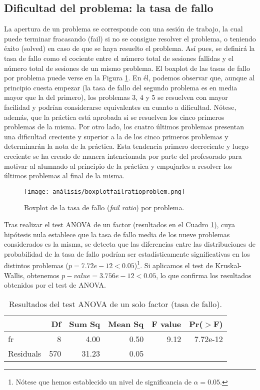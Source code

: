 \subsection{Dificultad del problema: la tasa de fallo}

La apertura de un problema se corresponde con una sesión de trabajo, la cual puede terminar fracasando (fail) si no se consigue resolver el problema, o teniendo éxito (solved) en caso de que se haya resuelto el problema. Así pues, se definirá la tasa de fallo como el cociente entre el número total de sesiones fallidas y el número total de sesiones de un mismo problema. El boxplot de las tasas de fallo por problema puede verse en la Figura \ref{fig:boxplotfailratio}. En él, podemos observar que, aunque al principio cuesta empezar (la tasa de fallo del segundo problema es en media mayor que la del primero), los problemas $3$, $4$ y $5$ se resuelven con mayor facilidad y podrían considerarse equivalentes en cuanto a dificultad. Nótese, además, que la práctica está aprobada si se resuelven los cinco primeros problemas de la misma. Por otro lado, los cuatro últimos problemas presentan una dificultad creciente y superior a la de los cinco primeros problemas y determinarán la nota de la práctica. Esta tendencia primero decreciente y luego creciente se ha creado de manera intencionada por parte del profesorado para motivar al alumnado al principio de la práctica y empujarles a resolver los últimos problemas al final de la misma.

\begin{figure}[H]
    \centering
    \texttt{[image: análisis/boxplotfailratioproblem.png]}
    \caption{Boxplot de la tasa de fallo (\emph{fail ratio}) por problema.}
    \label{fig:boxplotfailratio}
\end{figure}

Tras realizar el test ANOVA de un factor (resultados en el Cuadro \ref{tab:ANOVAfailratio}), cuya hipótesis nula establece que la tasa de fallo media de los nueve problemas considerados es la misma, se detecta que las diferencias entre las distribuciones de probabilidad de la tasa de fallo  podrían ser estadísticamente significativas en los distintos problemas ($p = 7.72e-12 < 0.05$)\footnote{Nótese que hemos establecido un nivel de significancia de $\alpha = 0.05$.}. Si aplicamos el test de Kruskal-Wallis, obtenemos $p-value = 3.756e-12 < 0.05$, lo que confirma los resultados obtenidos por el test de ANOVA.

\begin{table}[H]
\centering
\caption{Resultados del test ANOVA de un solo factor (tasa de fallo).}
\label{tab:ANOVAfailratio}
\begin{tabular}{lrrrrr}
  \hline
 & Df & Sum Sq & Mean Sq & F value & Pr($>$F) \\ 
  \hline
fr & 8 & 4.00 & 0.50 & 9.12 & 7.72e-12 \\ 
  Residuals        & 570 & 31.23 & 0.05 &  &  \\ 
   \hline
\end{tabular}
\end{table}

